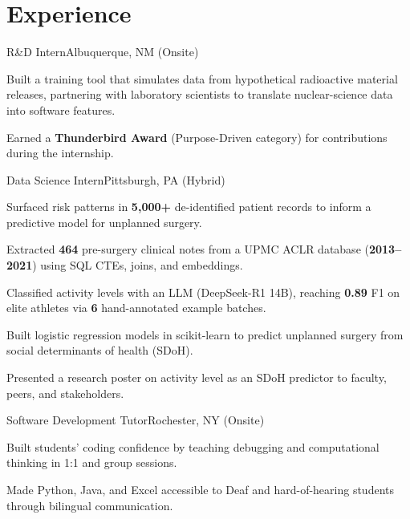 \section{Experience}

      {R\&D Intern}{Albuquerque, NM (Onsite)}
\begin{highlights}
  \item Built a training tool that simulates data from hypothetical radioactive material releases, partnering with
        laboratory scientists to translate nuclear-science data into software features.
  \item Earned a \textbf{Thunderbird Award} (Purpose-Driven category) for contributions during the internship.
\end{highlights}

      {Data Science Intern}{Pittsburgh, PA (Hybrid)}
\begin{highlights}
  \item Surfaced risk patterns in \textbf{5,000+} de-identified patient records to inform a predictive model for unplanned surgery.
  \item Extracted \textbf{464} pre-surgery clinical notes from a UPMC ACLR database (\textbf{2013--2021}) using SQL CTEs, joins, and embeddings.
  \item Classified activity levels with an LLM (DeepSeek-R1 14B), reaching \textbf{0.89} F1 on elite athletes via \textbf{6} hand-annotated example batches.
  \item Built logistic regression models in scikit-learn to predict unplanned surgery from social determinants of health (SDoH).
  \item Presented a research poster on activity level as an SDoH predictor to faculty, peers, and stakeholders.
\end{highlights}

      {Software Development Tutor}{Rochester, NY (Onsite)}
\begin{highlights}
  \item Built students' coding confidence by teaching debugging and computational thinking in 1:1 and group sessions.
  \item Made Python, Java, and Excel accessible to Deaf and hard-of-hearing students through bilingual communication.
\end{highlights}

